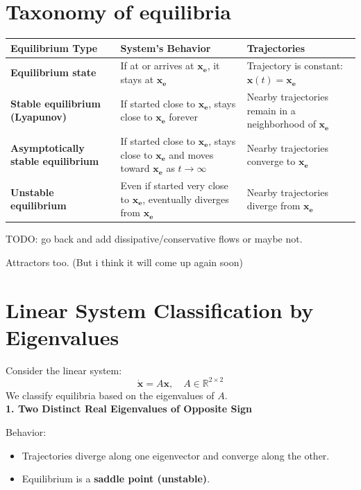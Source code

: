 \documentclass{report}
\begin{document}
\section*{Taxonomy of equilibria}

\begin{table}[h!]
\centering
\renewcommand{\arraystretch}{1.3}
\setlength{\tabcolsep}{8pt}
\begin{tabular}{>{\bfseries}m{3.5cm} m{6cm} m{5cm}}
\textbf{Equilibrium Type} & \textbf{System’s Behavior} & \textbf{Trajectories} \\ 
\midrule
Equilibrium state &
If at or arrives at $\mathbf{x_e}$, it stays at $\mathbf{x_e}$ &
Trajectory is constant: $\mathbf{x}(t) = \mathbf{x_e}$ \\

Stable equilibrium (Lyapunov) &
If started close to $\mathbf{x_e}$, stays close to $\mathbf{x_e}$ forever &
Nearby trajectories remain in a neighborhood of $\mathbf{x_e}$ \\

Asymptotically stable equilibrium &
If started close to $\mathbf{x_e}$, stays close to $\mathbf{x_e}$ and moves toward $\mathbf{x_e}$ as $t \to \infty$ &
Nearby trajectories converge to $\mathbf{x_e}$ \\

Unstable equilibrium &
Even if started very close to $\mathbf{x_e}$, eventually diverges from $\mathbf{x_e}$ &
Nearby trajectories diverge from $\mathbf{x_e}$ \\
\bottomrule
\end{tabular}
\end{table}

TODO: go back and add dissipative/conservative flows or maybe not. 

Attractors too. (But i think it will come up again soon)

\section*{Linear System Classification by Eigenvalues}

Consider the linear system:
\[
\dot{\mathbf{x}} = A\mathbf{x}, \quad A \in \mathbb{R}^{2\times 2}
\]
We classify equilibria based on the eigenvalues of \( A \).
\\ 

\textbf{1. Two Distinct Real Eigenvalues of Opposite Sign}

Behavior:
\begin{itemize}
  \item Trajectories diverge along one eigenvector and converge along the other.
  \item Equilibrium is a \textbf{saddle point (unstable)}.
\end{itemize}
\end{document}

